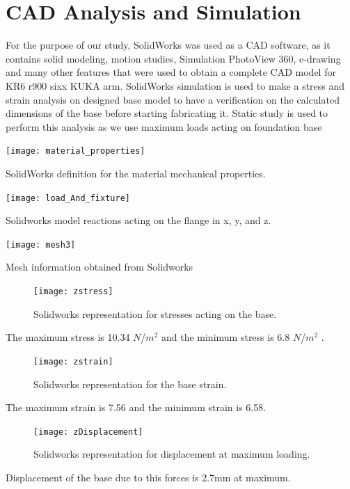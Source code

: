 \newpage

\section{CAD Analysis and Simulation}
For the purpose of our study, SolidWorks was used as a CAD software, as it contains solid modeling, motion studies, Simulation PhotoView 360, e-drawing and many other features that were used to obtain a complete CAD model for KR6 r900 sixx KUKA arm. 
\newline SolidWorks simulation is used to make a stress and strain analysis on designed base model to have a verification on the calculated dimensions of the base before starting fabricating it. Static study is used to perform this analysis as we use maximum loads acting on foundation base 


\begin{table}[H]
	\centering
	\texttt{[image: material\_properties]}
	\caption{SolidWorks definition for the material mechanical properties.}
	\label{table:5}
\end{table}



\begin{table}[H]
	
	\centering
	\texttt{[image: load\_And\_fixture]}
	\caption{Solidworks model reactions acting on the flange in x, y, and z.} 
	\label{table:6}
\end{table}


\begin{table}[H]
	\centering
	\texttt{[image: mesh3]}
	\caption{Mesh information obtained from Solidworks} 
	\label{table:7}
\end{table}
\newpage
\begin{figure}[H]
	\centering
	\texttt{[image: zstress]}
	\caption{Solidworks representation for stresses acting on the base.} 
\end{figure}
\begin{center}
	The maximum stress is 10.34 $N$/$m^{2}$ and the minimum stress is 6.8 $N$/$m^{2}$ .
\end{center}

\begin{figure}[H]
	\centering
	\texttt{[image: zstrain]}
	\caption{Solidworks representation for the base strain.} 
\end{figure}
\begin{center}
	The maximum strain is 7.56 and the minimum strain is 6.58.
\end{center}
\begin{figure}[H]
	\centering
	\texttt{[image: zDisplacement]}
	\caption{Solidworks representation for displacement at maximum loading.} 
\end{figure}
\begin{center}
	 Displacement of the base due to this forces is 2.7mm at maximum.
\end{center}


